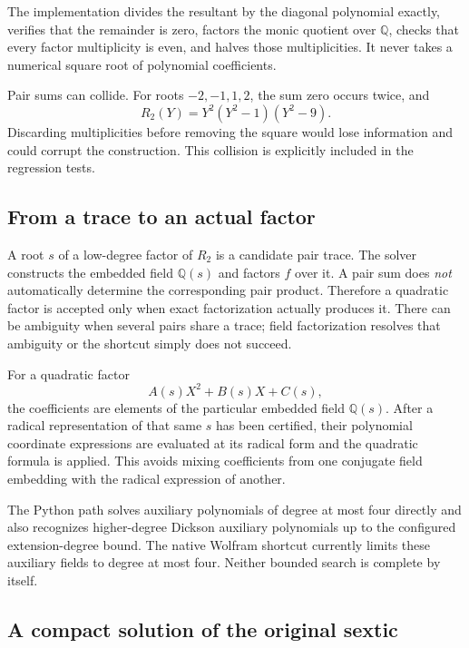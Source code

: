 \documentclass[11pt,a4paper]{article}
\newcommand{\Q}{\mathbb Q}
\theoremstyle{definition}
\theoremstyle{remark}
\begin{document}
The implementation divides the resultant by the diagonal polynomial exactly, verifies that the remainder is zero, factors the monic quotient over $\Q$, checks that every factor multiplicity is even, and halves those multiplicities. It never takes a numerical square root of polynomial coefficients.

Pair sums can collide. For roots $-2,-1,1,2$, the sum zero occurs twice, and
\[
 R_2(Y)=Y^2(Y^2-1)(Y^2-9).
\]
Discarding multiplicities before removing the square would lose information and could corrupt the construction. This collision is explicitly included in the regression tests.

\subsection{From a trace to an actual factor}

A root $s$ of a low-degree factor of $R_2$ is a candidate pair trace. The solver constructs the embedded field $\Q(s)$ and factors $f$ over it. A pair sum does \emph{not} automatically determine the corresponding pair product. Therefore a quadratic factor is accepted only when exact factorization actually produces it. There can be ambiguity when several pairs share a trace; field factorization resolves that ambiguity or the shortcut simply does not succeed.

For a quadratic factor
\[
 A(s)X^2+B(s)X+C(s),
\]
the coefficients are elements of the particular embedded field $\Q(s)$. After a radical representation of that same $s$ has been certified, their polynomial coordinate expressions are evaluated at its radical form and the quadratic formula is applied. This avoids mixing coefficients from one conjugate field embedding with the radical expression of another.

The Python path solves auxiliary polynomials of degree at most four directly and also recognizes higher-degree Dickson auxiliary polynomials up to the configured extension-degree bound. The native Wolfram shortcut currently limits these auxiliary fields to degree at most four. Neither bounded search is complete by itself.

\subsection{A compact solution of the original sextic}
\end{document}
